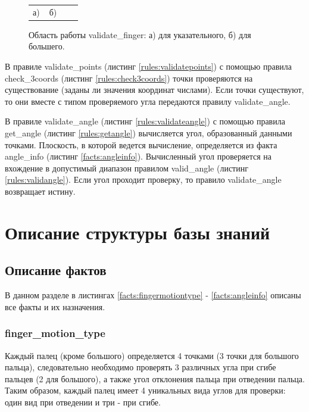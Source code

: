 \begin{figure}[H]
\begin{minipage}[h]{0.32\linewidth}
\end{minipage}
\begin{minipage}[h]{1\linewidth}
\begin{tabular}{p{0.32\linewidth}p{0.32\linewidth}p{0.32\linewidth}}
\centering а) & \centering б)\\
\end{tabular}
\end{minipage}
\vspace*{-1cm}
\caption{Область работы validate\_finger: а) для указательного, б) для большего.}
\label{fig:valfinger}
\end{figure}

\hspace{0.6cm} В правиле validate\_points (листинг \ref{rules:validatepoints}) с помощью правила check\_3coords (листинг \ref{rules:check3coords}) точки проверяются на существование (заданы ли значения координат числами). Если точки существуют, то они вместе с типом проверяемого угла передаются правилу validate\_angle.

\hspace{0.6cm} В правиле validate\_angle (листинг \ref{rules:validateangle}) с помощью правила get\_angle (листинг \ref{rules:getangle}) вычисляется угол, образованный данными точками. Плоскость, в которой ведется вычисление, определяется из факта angle\_info (листинг \ref{facts:angleinfo}). Вычисленный угол проверяется на вхождение в допустимый диапазон правилом valid\_angle (листинг \ref{rules:validangle}). Если угол проходит проверку, то правило validate\_angle возвращает истину.



\section{Описание структуры базы знаний}

\subsection{Описание фактов}
\hspace{0.6cm} В данном разделе в листингах \ref{facts:fingermotiontype} - \ref{facts:angleinfo} описаны все факты и их назначения.
\subsubsection{finger\_motion\_type}
\hspace{0.6cm} Каждый палец (кроме большого) определяется 4 точками (3 точки для большого пальца), следовательно необходимо проверять 3 различных угла при сгибе пальцев (2 для большого), а также угол отклонения пальца при отведении пальца. Таким образом, каждый палец имеет 4 уникальных вида углов для проверки: один вид при отведении и три - при сгибе. 

